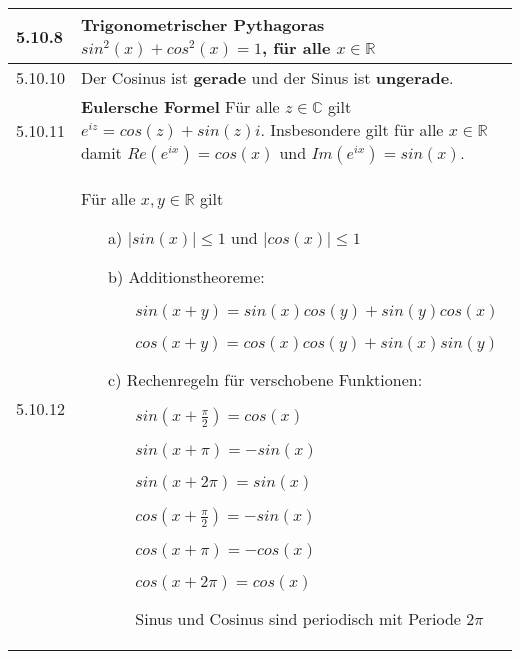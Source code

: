     \begin{longtable}{p{1cm} p{16cm}}
        \toprule

        5.10.8& \textbf{Trigonometrischer Pythagoras}\hfill \break
                $sin^2(x) + cos^2(x) = 1$, für alle $x \in \mathbb{R}$ \\
        \midrule
        5.10.10&Der Cosinus ist \textbf{gerade} und der Sinus ist \textbf{ungerade}. \\
        \midrule
        5.10.11&\textbf{Eulersche Formel} \hfill \break
                Für alle $z \in \mathbb{C}$ gilt $e^{iz} = cos(z)+sin(z)i$. \hfill \break
                Insbesondere gilt für alle $x \in \mathbb{R}$ damit $Re(e^{ix}) = cos(x)$ und $Im(e^{ix})=sin(x)$. \\
        \midrule
        5.10.12&Für alle $x,y \in \mathbb{R}$ gilt 
                \begin{itemize}[topsep=-0.5cm]
                    \item[a)] $|sin(x)| \leq 1$ und $|cos(x)| \leq 1$
                    \item[b)] Additionstheoreme:
                                \begin{itemize}[topsep=-0.5cm]
                                    \item[] $sin(x+y) = sin(x)cos(y)+sin(y)cos(x)$
                                    \item[] $cos(x+y) = cos(x)cos(y)+sin(x)sin(y)$ 
                                \end{itemize}
                    \item[c)] Rechenregeln für verschobene Funktionen:
                                \begin{itemize}[topsep=-0.5cm]
                                    \item[] $sin(x + \frac{\pi}{2}) = cos(x)$
                                    \item[] $sin(x + \pi) = -sin(x)$
                                    \item[] $sin(x+2\pi) = sin(x)$
                                    \item[] $cos(x + \frac{\pi}{2}) = -sin(x)$
                                    \item[] $cos(x+\pi) = -cos(x)$
                                    \item[] $cos(x+2\pi) = cos(x)$
                                    \item[] Sinus und Cosinus sind periodisch mit Periode $2\pi$      
                                \end{itemize} \vspace{-0cm}

\end{itemize}
\end{longtable}
